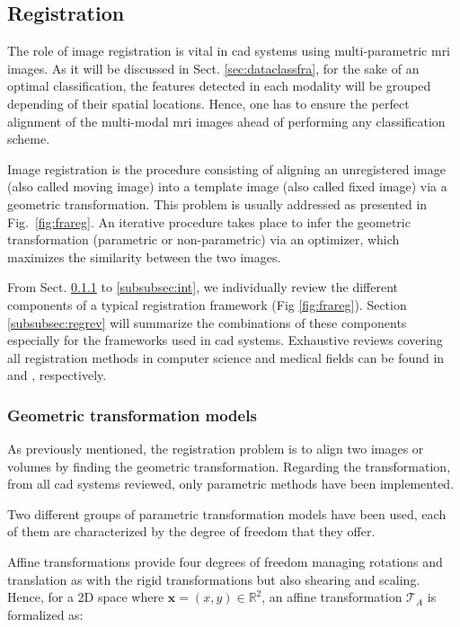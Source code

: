 \subsection{Registration} \label{subsec:registration}

The role of image registration is vital in \ac{cad} systems using multi-parametric \ac{mri} images. As it will be discussed in Sect. \ref{sec:dataclassfra}, for the sake of an optimal classification, the features detected in each modality will be grouped depending of their spatial locations. Hence, one has to ensure the perfect alignment of the multi-modal \ac{mri} images ahead of performing any classification scheme.

Image registration is the procedure consisting of aligning an unregistered image (also called moving image) into a template image (also called fixed image) via a geometric transformation. This problem is usually addressed as presented in Fig.~\ref{fig:frareg}. An iterative procedure takes place to infer the geometric transformation (parametric or non-parametric) via an optimizer, which maximizes the similarity between the two images.

From Sect. \ref{subsubsec:geotra} to \ref{subsubsec:int}, we individually review the different components of a typical registration framework (Fig \ref{fig:frareg}). Section \ref{subsubsec:regrev} will summarize the combinations of these components especially for the frameworks used in \ac{cad} systems. Exhaustive reviews covering all registration methods in computer science and medical fields can be found in \cite{Maintz1998} and \cite{Zitova2003}, respectively.

\subsubsection{Geometric transformation models}\label{subsubsec:geotra}

As previously mentioned, the registration problem is to align two images or volumes by finding the geometric transformation. Regarding the transformation, from all \ac{cad} systems reviewed, only parametric methods have been implemented.

Two different groups of parametric transformation models have been used, each of them are characterized by the degree of freedom that they offer.

Affine transformations provide four degrees of freedom managing rotations and translation as with the rigid transformations but also shearing and scaling. Hence, for a 2D space where $\mathbf{x} = (x,y) \in \mathbb{R}^2$, an affine transformation $\mathcal{T}_A$ is formalized as: 

